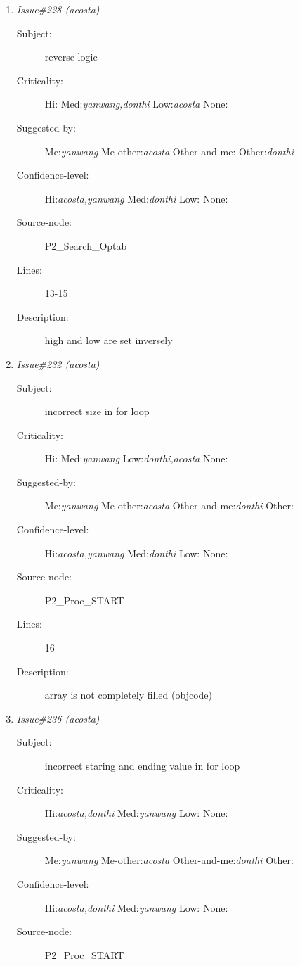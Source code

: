 \begin{enumerate}
\begin{description}
\item [Lines:] 31-32

\item [Description:] loop does not comletely fill operation[]
\end{description}
\item {\it Issue\#228 (acosta)}
\begin{description}
\item [Subject:] reverse logic
\item [Criticality:] Hi:{\it } Med:{\it yanwang,donthi} Low:{\it acosta} None:{\it }
\item [Suggested-by:] Me:{\it yanwang} Me-other:{\it acosta} Other-and-me:{\it } Other:{\it donthi}
\item [Confidence-level:] Hi:{\it acosta,yanwang} Med:{\it donthi} Low:{\it } None:{\it }
\item [Source-node:] P2\_Search\_Optab

\item [Lines:] 13-15

\item [Description:] high and low are set inversely
\end{description}
\item {\it Issue\#232 (acosta)}
\begin{description}
\item [Subject:] incorrect size in for loop
\item [Criticality:] Hi:{\it } Med:{\it yanwang} Low:{\it donthi,acosta} None:{\it }
\item [Suggested-by:] Me:{\it yanwang} Me-other:{\it acosta} Other-and-me:{\it donthi} Other:{\it }
\item [Confidence-level:] Hi:{\it acosta,yanwang} Med:{\it donthi} Low:{\it } None:{\it }
\item [Source-node:] P2\_Proc\_START

\item [Lines:] 16

\item [Description:] array is not completely filled (objcode)
\end{description}
\item {\it Issue\#236 (acosta)}
\begin{description}
\item [Subject:] incorrect staring and ending value in for loop
\item [Criticality:] Hi:{\it acosta,donthi} Med:{\it yanwang} Low:{\it } None:{\it }
\item [Suggested-by:] Me:{\it yanwang} Me-other:{\it acosta} Other-and-me:{\it donthi} Other:{\it }
\item [Confidence-level:] Hi:{\it acosta,donthi} Med:{\it yanwang} Low:{\it } None:{\it }
\item [Source-node:] P2\_Proc\_START


\end{description}
\end{enumerate}
